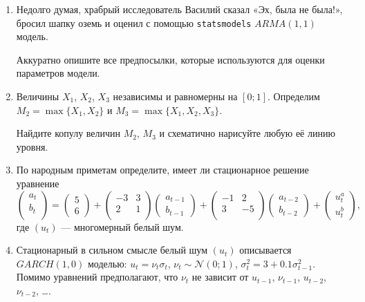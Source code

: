 \documentclass[12pt]{article}
\newcommand \cN{\mathcal{N}}
\begin{document}

\begin{enumerate}

\item Недолго думая, храбрый исследователь Василий
сказал «Эх, была не была!», бросил шапку оземь и
оценил с помощью \verb|statsmodels| $ARMA(1,1)$ модель. 

Аккуратно опишите все предпосылки, которые используются для оценки параметров модели.


\item Величины $X_1$, $X_2$, $X_3$ независимы и равномерны на $[0;1]$.
Определим $M_2 = \max\{ X_1, X_2\}$ и $M_3 = \max\{X_1, X_2, X_3\}$.

Найдите копулу величин $M_2$, $M_3$ и схематично нарисуйте любую её линию уровня. 

\item По народным приметам определите, имеет ли стационарное решение уравнение
\[
\begin{pmatrix}
    a_t \\
    b_t \\
\end{pmatrix} =
\begin{pmatrix}
    5 \\
    6 
\end{pmatrix}  +
\begin{pmatrix}
    -3 & 3 \\
    2 & 1 \\
\end{pmatrix}
\begin{pmatrix}
    a_{t-1} \\
    b_{t-1}
\end{pmatrix} +
\begin{pmatrix}
    -1 & 2 \\
    3 & -5 \\
\end{pmatrix}
\begin{pmatrix}
    a_{t-2} \\
    b_{t-2}
\end{pmatrix} +
\begin{pmatrix}
    u_t^a \\
    u_t^b
\end{pmatrix},
\]
где $(u_t)$ — многомерный белый шум. 

\item Стационарный в сильном смысле белый шум $(u_t)$ описывается $GARCH(1, 0)$ моделью:
$u_t = \nu_t \sigma_t$, $\nu_t \sim \cN(0;1)$, $\sigma_t^2 = 3 + 0.1 \sigma_{t-1}^2$.
Помимо уравнений предполагают, что $\nu_t$ не зависит от $u_{t-1}$, $\nu_{t-1}$, $u_{t-2}$, $\nu_{t-2}$, \ldots. 


\end{enumerate}
\end{document}
